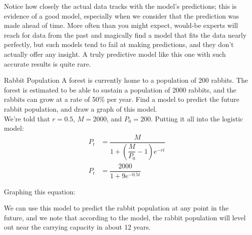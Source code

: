 Notice how closely the actual data tracks with the model's predictions; this is evidence of a good model, especially when we consider that the prediction was made ahead of time.  More often than you might expect, would-be experts will reach for data from the past and magically find a model that fits the data nearly perfectly, but such models tend to fail at making predictions, and they don't actually offer any insight.  A truly predictive model like this one with such accurate results is quite rare.
\pagebreak

\begin{example}[https://www.youtube.com/watch?v=mmL2H7_ynUA]{Rabbit Population}
A forest is currently home to a population of 200 rabbits.  The forest is estimated to be able to sustain a population of 2000 rabbits, and the rabbits can grow at a rate of 50\% per year.  Find a model to predict the future rabbit population, and draw a graph of this model.\\

We're told that $r=0.5$, $M=2000$, and $P_0=200$.  Putting it all into the logistic model:
\begin{align*}
P_t &= \dfrac{M}{1+\left(\dfrac{M}{P_0}-1\right)e^{-rt}}\\
P_t &= \dfrac{2000}{1+9e^{-0.5t}}
\end{align*}

Graphing this equation:
\begin{center}
\end{center}

We can use this model to predict the rabbit population at any point in the future, and we note that according to the model, the rabbit population will level out near the carrying capacity in about 12 years.
\end{example}
\pagebreak

